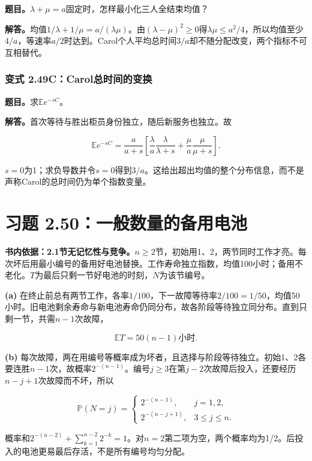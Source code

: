 \documentclass[12pt,a4paper,UTF8,fontset=fandol]{ctexart}
\begin{document}
\textbf{题目。}\(\lambda+\mu=a\)固定时，怎样最小化三人全结束均值？

\textbf{解答。}均值\(1/\lambda+1/\mu=a/(\lambda\mu)\)。由\((\lambda-\mu)^2\ge0\)得\(\lambda\mu\le a^2/4\)，所以均值至少\(4/a\)，等速率\(a/2\)时达到。Carol个人平均总时间\(3/a\)却不随分配改变，两个指标不可互相替代。

\subsubsection{变式
2.49C：Carol总时间的变换}\label{ux53d8ux5f0f-2.49ccarolux603bux65f6ux95f4ux7684ux53d8ux6362}

\textbf{题目。}求\(\mathbb Ee^{-sC}\)。

\textbf{解答。}首次等待与胜出柜员身份独立，随后新服务也独立。故

\[\mathbb Ee^{-sC}=\frac a{a+s}
\left[\frac\lambda a\frac\lambda{\lambda+s}
+\frac\mu a\frac\mu{\mu+s}\right].\]

\(s=0\)为1；求负导数并令\(s=0\)得到\(3/a\)。这给出超出均值的整个分布信息，而不是声称Carol的总时间仍为单个指数变量。

\section{习题
2.50：一般数量的备用电池}\label{ux4e60ux9898-2.50ux4e00ux822cux6570ux91cfux7684ux5907ux7528ux7535ux6c60}

\textbf{书内依据：2.1节无记忆性与竞争。}\(n\ge2\)节，初始用1、2，两节同时工作才亮。每次坏后用最小编号的备用好电池替换。工作寿命独立指数，均值100小时；备用不老化。\(T\)为最后只剩一节好电池的时刻，\(N\)为该节编号。

\textbf{(a)}
在终止前总有两节工作，各率\(1/100\)，下一故障等待率\(2/100=1/50\)，均值50小时。旧电池剩余寿命与新电池寿命仍同分布，故各阶段等待独立同分布。直到只剩一节，共需\(n-1\)次故障，

\[\boxed{\mathbb ET=50(n-1)\text{小时}.}\]

\textbf{(b)}
每次故障，两在用编号等概率成为坏者，且选择与阶段等待独立。初始1、2各要连胜\(n-1\)次，故概率\(2^{-(n-1)}\)。编号\(j\ge3\)在第\(j-2\)次故障后投入，还要经历\(n-j+1\)次故障而不坏，所以

\[\boxed{\mathbb P(N=j)=
\begin{cases}
2^{-(n-1)},&j=1,2,\\
2^{-(n-j+1)},&3\le j\le n.
\end{cases}}\]

概率和\(2^{-(n-2)}+\sum_{k=1}^{n-2}2^{-k}=1\)。对\(n=2\)第二项为空，两个概率均为1/2。后投入的电池更易最后存活，不是所有编号均匀分配。
\end{document}
